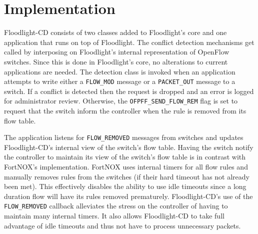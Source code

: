 \section{Implementation}
\label{sec:implementation}

Floodlight-CD consists of two classes added to Floodlight's core and one application that runs on top of Floodlight.
The conflict detection mechanisms get called by interposing on Floodlight's internal representation of OpenFlow switches.
Since this is done in Floodlight's core, no alterations to current applications are needed.
The detection class is invoked when an application attempts to write either a \texttt{FLOW\_MOD} message or a \texttt{PACKET\_OUT} message to a switch.
If a conflict is detected then the request is dropped and an error is logged for administrator review.
Otherwise, the \texttt{OFPFF\_SEND\_FLOW\_REM} flag is set to request that the switch inform the controller when the rule is removed from its flow table.

The application listens for \texttt{FLOW\_REMOVED} messages from switches and updates Floodlight-CD's internal view of the switch's flow table.
Having the switch notify the controller to maintain its view of the switch's flow table is in contrast with FortNOX's implementation.
FortNOX uses internal timers for all flow rules and manually removes rules from the switches (if their hard timeout has not already been met).
This effectively disables the ability to use idle timeouts since a long duration flow will have its rules removed prematurely.
Floodlight-CD's use of the \texttt{FLOW\_REMOVED} callback alleviates the stress on the controller of having to maintain many internal timers.
It also allows Floodlight-CD to take full advantage of idle timeouts and thus not have to process unnecessary packets.

